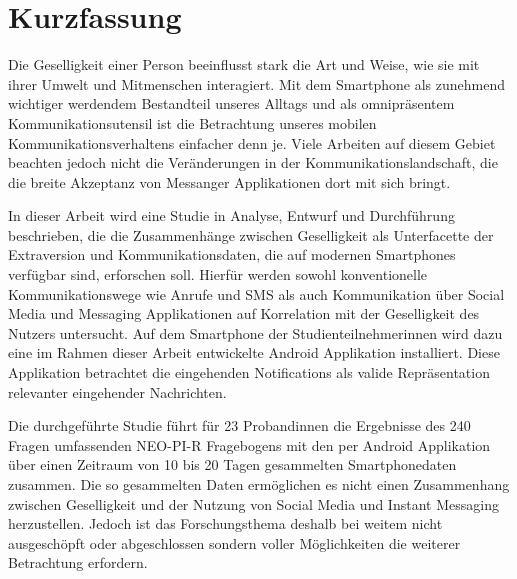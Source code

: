 
\chapter*{Kurzfassung}
\label{ch:GermanAbstract}

Die Geselligkeit einer Person beeinflusst stark die Art und Weise, wie sie mit ihrer Umwelt und Mitmenschen interagiert. 
Mit dem Smartphone als zunehmend wichtiger werdendem Bestandteil unseres Alltags und als omnipräsentem Kommunikationsutensil ist 
die Betrachtung unseres mobilen Kommunikationsverhaltens einfacher denn je. 
Viele Arbeiten auf diesem Gebiet beachten jedoch nicht die Veränderungen in der Kommunikationslandschaft, die die breite Akzeptanz von Messanger Applikationen dort mit sich bringt.
\par
In dieser Arbeit wird eine Studie in Analyse, Entwurf und Durchführung beschrieben, die die Zusammenhänge zwischen Geselligkeit als Unterfacette der Extraversion und Kommunikationsdaten, die auf modernen Smartphones verfügbar sind, erforschen soll. 
Hierfür werden sowohl konventionelle Kommunikationswege wie Anrufe und SMS als auch Kommunikation über Social Media und Messaging Applikationen auf Korrelation mit der Geselligkeit des Nutzers untersucht.
Auf dem Smartphone der Studienteilnehmerinnen wird dazu eine im Rahmen dieser Arbeit entwickelte Android Applikation installiert.
Diese Applikation betrachtet die eingehenden Notifications als valide Repräsentation relevanter eingehender Nachrichten.
\par
Die durchgeführte Studie führt für 23 Probandinnen die Ergebnisse des 240 Fragen umfassenden NEO-PI-R Fragebogens mit den per Android Applikation über einen Zeitraum von 10 bis 20 Tagen gesammelten Smartphonedaten zusammen.
Die so gesammelten Daten ermöglichen es nicht einen Zusammenhang zwischen Geselligkeit und der Nutzung von Social Media und Instant Messaging herzustellen.
Jedoch ist das Forschungsthema deshalb bei weitem nicht ausgeschöpft oder abgeschlossen sondern voller Möglichkeiten die weiterer Betrachtung erfordern.
\par 


